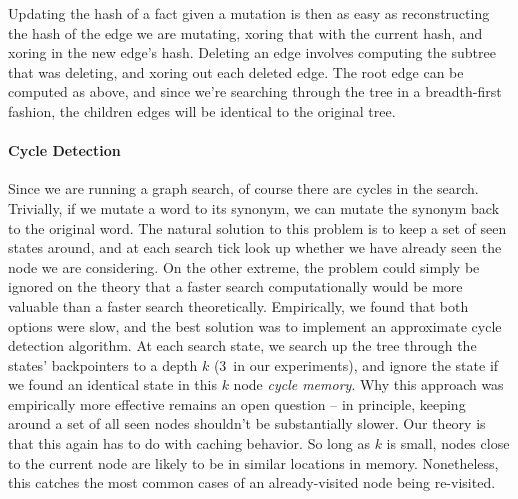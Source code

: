 Updating the hash of a fact given a mutation is then as easy as reconstructing the hash of the edge we are
  mutating, xoring that with the current hash, and xoring in the new edge's hash.
Deleting an edge involves computing the subtree that was deleting, and xoring out each deleted edge.
  The root edge can be computed as above, and since we're searching through the tree in a breadth-first
  fashion, the children edges will be identical to the original tree.



\paragraph{Cycle Detection}
Since we are running a graph search, of course there are cycles in the search.
Trivially, if we mutate a word to its synonym, we can mutate the synonym back to the original word.
The natural solution to this problem is to keep a set of seen states around, and at each search tick look up
  whether we have already seen the node we are considering.
On the other extreme, the problem could simply be ignored on the theory that a faster search computationally
  would be more valuable than a faster search theoretically.
Empirically, we found that both options were slow, and the best solution was to implement an approximate cycle
  detection algorithm.
At each search state, we search up the tree through the states' backpointers to a depth $k$ (3\ in our experiments),
  and ignore the state if we found an identical state in this $k$ node \textit{cycle memory}.
Why this approach was empirically more effective remains an open question -- 
  in principle, keeping around a set of all seen nodes shouldn't be substantially slower.
Our theory is that this again has to do with caching behavior.
So long as $k$ is small, nodes close to the current node are likely to be in similar locations in memory.
Nonetheless, this catches the most common cases of an already-visited node being re-visited.
